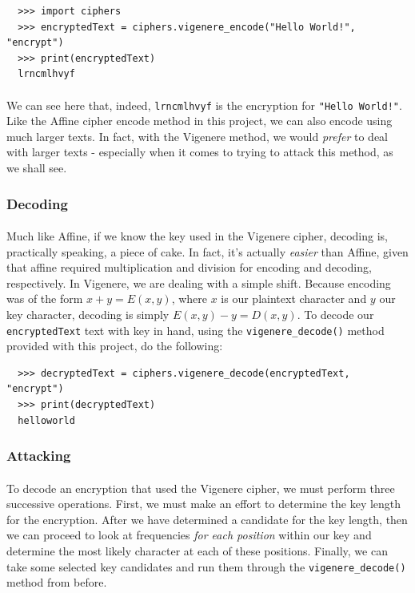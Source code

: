 \documentclass[12pt,a4paper]{article}
\begin{document}
\begin{verbatim}
  >>> import ciphers
  >>> encryptedText = ciphers.vigenere_encode("Hello World!", "encrypt")
  >>> print(encryptedText)
  lrncmlhvyf
\end{verbatim}

\paragraph{}
We can see here that, indeed, \verb|lrncmlhvyf| is the encryption for 
\verb|"Hello World!"|.  Like the Affine cipher encode method in this project,
we can also encode using much larger texts.  In fact, with the Vigenere method, 
we would \textit{prefer} to deal with larger texts - especially when it comes 
to trying to attack this method, as we shall see.

\subsubsection{Decoding}
\paragraph{}
Much like Affine, if we know the key used in the Vigenere cipher, decoding is, 
practically speaking, a piece of cake.  In fact, it's actually \textit{easier} 
than Affine, given that affine required multiplication and division for 
encoding and decoding, respectively.  In Vigenere, we are dealing with a simple 
shift.  Because encoding was of the form $x + y = E(x,y)$, where $x$ is our 
plaintext character and $y$ our key character, decoding is simply 
$E(x,y) - y = D(x,y)$.  To decode our \verb|encryptedText| text with key in 
hand, using the \verb|vigenere_decode()| method provided with this project, do 
the following:

\begin{verbatim}
  >>> decryptedText = ciphers.vigenere_decode(encryptedText, "encrypt")
  >>> print(decryptedText)
  helloworld
\end{verbatim}

\subsubsection{Attacking}
\paragraph{}
To decode an encryption that used the Vigenere cipher, we must perform three 
successive operations.  First, we must make an effort to determine the key 
length for the encryption.  After we have determined a candidate for the key 
length, then we can proceed to look at frequencies \textit{for each position} 
within our key and determine the most likely character at each of these 
positions.  Finally, we can take some selected key candidates and run them 
through the \verb|vigenere_decode()| method from before.
\end{document}
